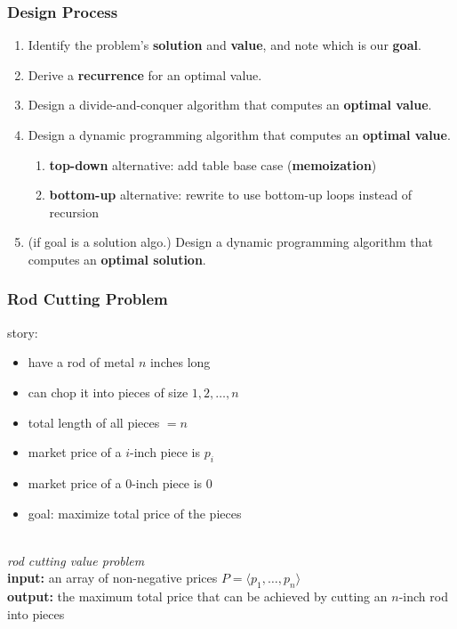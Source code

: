 \documentclass{beamer}
\newcommand{\stanza}{ \\~\ }
\begin{document}
\begin{frame} \frametitle{Design Process}
\begin{enumerate}
  \item Identify the problem's \textbf{solution} and \textbf{value}, and note which is our \textbf{goal}.
  \item Derive a \textbf{recurrence} for an optimal value.
  \item Design a divide-and-conquer algorithm that computes an \textbf{optimal value}.
  \item Design a dynamic programming algorithm that computes an \textbf{optimal value}.
  \begin{enumerate}
    \item \textbf{top-down} alternative: add table base case (\textbf{memoization})
    \item \textbf{bottom-up} alternative: rewrite to use bottom-up loops instead of recursion
  \end{enumerate}
  \item (if goal is a solution algo.) Design a dynamic programming algorithm that computes an \textbf{optimal solution}.
\end{enumerate}
\end{frame}

\begin{frame} \frametitle{Rod Cutting Problem}
story:
\begin{itemize}
  \item have a rod of metal $n$ inches long
  \item can chop it into pieces of size $1, 2, \ldots, n$
  \item total length of all pieces $=n$
  \item market price of a $i$-inch piece is $p_i$
  \item market price of a 0-inch piece is 0
  \item goal: maximize total price of the pieces \stanza
\end{itemize}

\emph{rod cutting value problem} \\
\textbf{input:} an array of non-negative prices $P=\langle p_1, \ldots, p_n \rangle$ \\
\textbf{output:} the maximum total price that can be achieved by cutting an $n$-inch rod into pieces
  
\end{frame}
\end{document}
